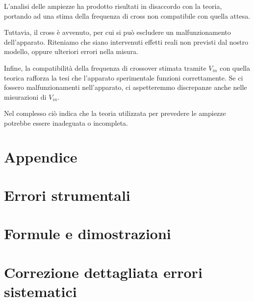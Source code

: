 \documentclass[12pt,a4paper]{article}
\begin{document}
L'analisi delle ampiezze ha prodotto risultati in disaccordo con la teoria, portando ad una stima della frequenza di cross non compatibile con quella attesa.

Tuttavia, il cross è avvenuto, per cui si può escludere un malfunzionamento dell'apparato. Riteniamo che siano intervenuti effetti reali non previsti dal nostro modello, oppure ulteriori errori nella misura.

 Infine, la compatibilità della frequenza di crossover stimata tramite $V_{in}$ con quella teorica rafforza la tesi che l'apparato sperimentale funzioni correttamente. Se ci fossero malfunzionamenti nell'apparato, ci aspetteremmo discrepanze anche nelle misurazioni di $V_{in}$. 
 
 Nel complesso ciò indica che la teoria utilizzata per prevedere le ampiezze potrebbe essere inadeguata o incompleta.

\section*{Appendice}
  \appendix

\section{Errori strumentali}\label{sec:errori_strumentali}

	

\section{Formule e dimostrazioni}\label{sec:formule-e-dimostrazioni}

  


\section{Correzione dettagliata errori sistematici}\label{sec:correzione-dettagliata-errori-sistematici}

  
\end{document}
